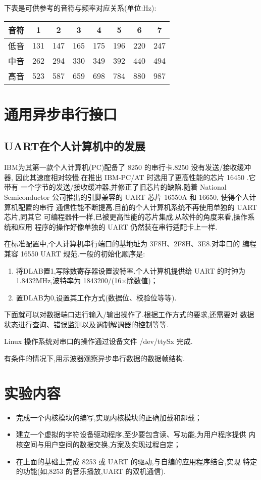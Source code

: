     下表是可供参考的音符与频率对应关系(单位:Hz):
\begin{table}[!h]
\centering\large
\begin{tabular}{|*8{|c}||} \toprule
   音符 &  1  &  2  &  3  &  4  &  5  &  6  &  7\\\midrule
   低音 & 131 & 147 & 165 & 175 & 196 & 220 & 247\\
   中音 & 262 & 294 & 330 & 349 & 392 & 440 & 494\\
   高音 & 523 & 587 & 659 & 698 & 784 & 880 & 987\\\bottomrule
\end{tabular}
\end{table}

\section{通用异步串行接口}
\subsection{UART在个人计算机中的发展}
	IBM为其第一款个人计算机(PC)配备了 8250 的串行卡.8250 没有发送/接收缓冲器,
因此其速度相对较慢.在推出 IBM-PC/AT 时选用了更高性能的芯片 16450 .它带有
一个字节的发送/接收缓冲器,并修正了旧芯片的缺陷.随着 National Semiconductor
公司推出的引脚兼容的 UART 芯片 16550A 和 16650, 使得个人计算机配置的串行
通信性能不断提高.目前的个人计算机系统不再使用单独的 UART 芯片,同其它
可编程器件一样,已被更高性能的芯片集成.从软件的角度来看,操作系统和应用
程序的操作好像单独的 UART 仍然装在串行适配卡上一样.

	在标准配置中,个人计算机串行端口的基地址为 3F8H、2F8H、3E8.对串口的
编程兼容 16550 UART 规范.一般的初始化顺序是:
\begin{enumerate}\itemsep=-3pt
  \item 将DLAB置1,写除数寄存器设置波特率.个人计算机提供给 UART 的时钟为
        1.8432MHz,波特率为 1843200/(16$\times$除数值)；
  \item 置DLAB为0,设置其工作方式(数据位、校验位等等).
\end{enumerate}

    下面就可以对数据端口进行输入/输出操作了.根据工作方式的要求,还需要对
数据状态进行查询、错误监测以及调制解调器的控制等等.

    Linux 操作系统对串口的操作通过设备文件 /dev/ttySx 完成.

    有条件的情况下,用示波器观察异步串行数据的数据帧结构.
\section{实验内容}
\begin{itemize}\itemsep=-3pt
  \item 完成一个内核模块的编写,实现内核模块的正确加载和卸载；
  \item 建立一个虚拟的字符设备驱动程序,至少要包含读、写功能,为用户程序提供
        内核空间与用户空间的数据交换,方案及实现过程自定；
  \item 在上面的基础上完成 8253 或 UART 的驱动,与自编的应用程序结合,实现
		特定的功能(如,8253 的音乐播放,UART 的双机通信).
\end{itemize}

